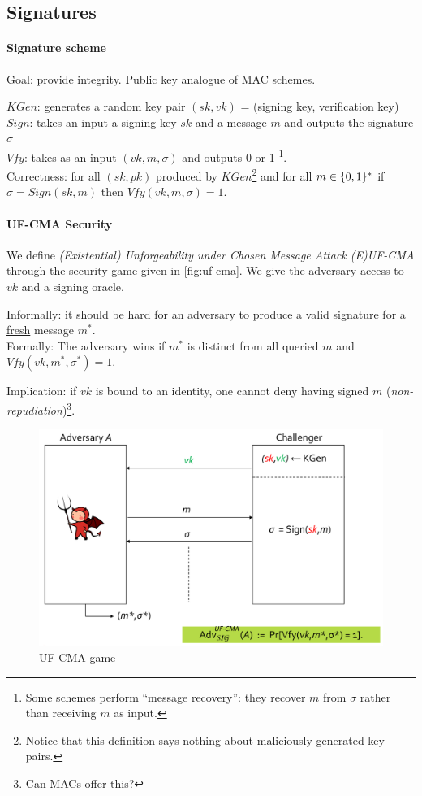 \subsection{Signatures}

\paragraph{Signature scheme}
Goal: provide integrity. Public key analogue of MAC schemes.

$KGen$: generates a random key pair $(sk, vk)$ = (signing key, verification key)
\\
$Sign$: takes an input a signing key $sk$ and a message $m$ and outputs the signature $\sigma$
\\
$Vfy$: takes as an input $(vk, m, \sigma)$ and outputs 0 or 1%
\footnote{Some schemes perform ``message recovery'': they recover $m$ from $\sigma$ rather than receiving $m$ as input.}.
\\
Correctness:
for all $(sk, pk)$ produced by $KGen$\footnote{Notice that this definition says nothing about maliciously generated key pairs.}
and for all $m \in \lbrace 0, 1 \rbrace^*$ if $\sigma = Sign(sk, m)$ then $Vfy(vk, m, \sigma) = 1$.

\paragraph{UF-CMA Security}
We define \emph{(Existential) Unforgeability under Chosen Message Attack (E)UF-CMA}
through the security game given in \autoref{fig:uf-cma}.
We give the adversary access to $vk$ and a signing oracle.

Informally: it should be hard for an adversary to produce a valid signature for a \underline{fresh} message $m^*$.
\\
Formally:
The adversary wins if $m^*$ is distinct from all queried $m$ and $Vfy(vk, m^*, \sigma^*) = 1$.

Implication: if $vk$ is bound to an identity, one cannot deny having signed $m$ (\emph{non-repudiation})\footnote{Can MACs offer this?}.

\begin{figure}[h]
    \centering
	\includegraphics[scale=0.35]{images/uf-cma.png}
    \caption{UF-CMA game}
    \label{fig:uf-cma}
\end{figure}

